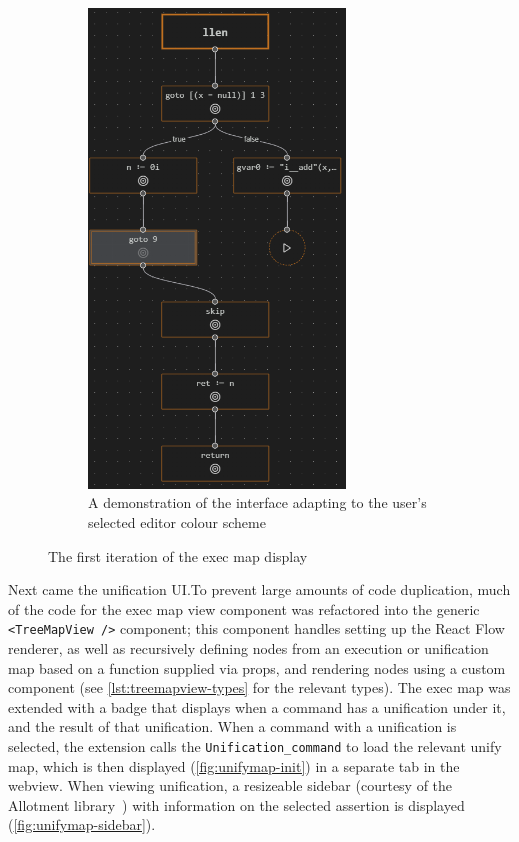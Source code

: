 \begin{figure}
\begin{subfigure}[b]{0.4\textwidth}
    \includegraphics[width=0.75\textwidth]{img/execmap-theming.png}
    \caption{
      A demonstration of the interface adapting to the user's selected editor
      colour scheme}%
    \label{fig:execmap-theming}
  \end{subfigure}
  \caption{The first iteration of the exec map display}
\end{figure}

Next came the unification UI.\@ To prevent large amounts of code duplication,
much of the code for the exec map view component was refactored into the generic
\texttt{<TreeMapView />} component; this component handles setting up the React
Flow renderer, as well as recursively defining nodes from an execution or
unification map based on a function supplied via props, and rendering nodes
using a custom component (see \autoref{lst:treemapview-types} for the relevant
types). The exec map was extended with a badge that displays when a command has
a unification under it, and the result of that unification. When a command with
a unification is selected, the extension calls the \texttt{Unification\_command}
to load the relevant unify map, which is then displayed
(\autoref{fig:unifymap-init}) in a separate tab in the webview. When viewing
unification, a resizeable sidebar (courtesy of the Allotment
library~\cite{allotment}) with information on the selected assertion is
displayed (\autoref{fig:unifymap-sidebar}).

